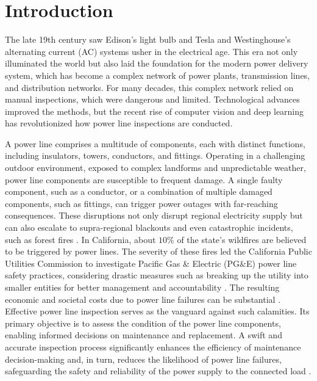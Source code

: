\section{Introduction}\label{sec:introduction}
The late 19th century saw Edison's light bulb and Tesla and Westinghouse's alternating current (AC) systems usher in the electrical age.  This era not only illuminated the world but also laid the foundation for the modern power delivery system, which has become a complex network of power plants, transmission lines, and distribution networks. For many decades, this complex network relied on manual inspections, which were dangerous and limited. Technological advances improved the methods, but the recent rise of computer vision and deep learning has revolutionized how power line inspections are conducted. 

A power line comprises a multitude of components, each with distinct functions, including insulators, towers, conductors, and fittings. Operating in a challenging outdoor environment, exposed to complex landforms and unpredictable weather, power line components are susceptible to frequent damage. A single faulty component, such as a conductor, or a combination of multiple damaged components, such as fittings, can trigger power outages with far-reaching consequences. These disruptions not only disrupt regional electricity supply but can also escalate to supra-regional blackouts and even catastrophic incidents, such as forest fires \cite{mitchell_power_2013}. In California, about \(10\%\) of the state's wildfires are believed to be triggered by power lines. The severity of these fires led the California Public Utilities Commission to investigate Pacific Gas \& Electric (PG\&E) power line safety practices, considering drastic measures such as breaking up the utility into smaller entities for better management and accountability \cite{noauthor_link_nodate}. The resulting economic and societal costs due to power line failures can be substantial \cite{salim_modeling_2018}. Effective power line inspection serves as the vanguard against such calamities. Its primary objective is to assess the condition of the power line components, enabling informed decisions on maintenance and replacement. A swift and accurate inspection process significantly enhances the efficiency of maintenance decision-making and, in turn, reduces the likelihood of power line failures, safeguarding the safety and reliability of the power supply to the connected load \cite{nguyen_automatic_2018}.

